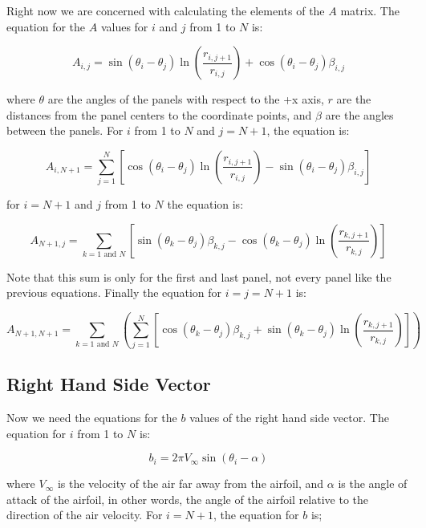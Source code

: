 \documentclass{article}%
\begin{document}
Right now we are concerned with calculating the elements of the $A$ matrix. The equation for the $A$ values for $i$ and $j$ from 1 to $N$ is:

\begin{equation}
	A_{i,j} = \sin(\theta_i-\theta_j) \ln\left(\frac{r_{i,j+1}}{r_{i,j}}\right) + \cos(\theta_i-\theta_j)\beta_{i,j}
\end{equation}

where $\theta$ are the angles of the panels with respect to the +x axis, $r$ are the distances from the panel centers to the coordinate points, and $\beta$ are the angles between the panels. For $i$ from 1 to $N$ and $j=N+1$, the equation is:

\begin{equation}
	A_{i,N+1} = \sum_{j=1}^N \left[ \cos(\theta_i-\theta_j) \ln\left(\frac{r_{i,j+1}}{r_{i,j}}\right) - \sin(\theta_i-\theta_j)\beta_{i,j} \right]
\end{equation}

for $i=N+1$ and $j$ from 1 to $N$ the equation is:

\begin{equation}
	A_{N+1,j} = \sum_{k=1 \text{ and } N} \left[ \sin(\theta_k-\theta_j)\beta_{k,j} - \cos(\theta_k-\theta_j) \ln\left(\frac{r_{k,j+1}}{r_{k,j}}\right) \right]
\end{equation}

Note that this sum is only for the first and last panel, not every panel like the previous equations. Finally the equation for $i=j=N+1$ is:

\begin{equation}
	A_{N+1,N+1} = \sum_{k=1 \text{ and } N}  \left(\sum_{j=1}^N \left[ \cos(\theta_k-\theta_j)\beta_{k,j} + \sin(\theta_k-\theta_j) \ln\left(\frac{r_{k,j+1}}{r_{k,j}}\right) \right] \right)
\end{equation}

\subsection*{Right Hand Side Vector}

Now we need the equations for the $b$ values of the right hand side vector. The equation for $i$ from 1 to $N$ is:

\begin{equation}
	b_i = 2\pi V_{\infty} \sin(\theta_i - \alpha)
\end{equation}

where $V_\infty$ is the velocity of the air far away from the airfoil, and $\alpha$ is the angle of attack of the airfoil, in other words, the angle of the airfoil relative to the direction of the air velocity. For $i=N+1$, the equation for $b$ is;
\end{document}
